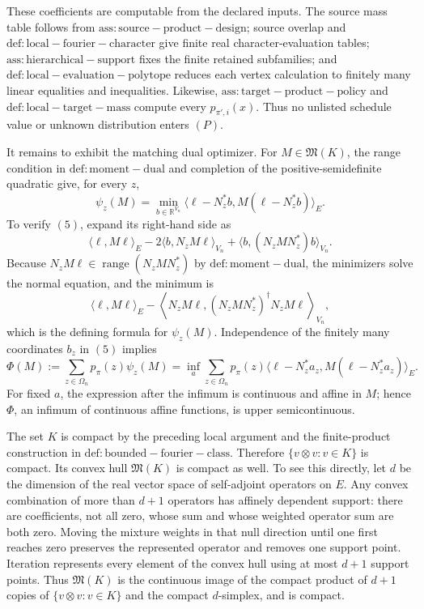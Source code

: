 These coefficients are computable from the declared inputs. The source mass table follows from \(\mathrm{ass:source-product-design}\); source overlap and \(\mathrm{def:local-fourier-character}\) give finite real character-evaluation tables; \(\mathrm{ass:hierarchical-support}\) fixes the finite retained subfamilies; and \(\mathrm{def:local-evaluation-polytope}\) reduces each vertex calculation to finitely many linear equalities and inequalities. Likewise, \(\mathrm{ass:target-product-policy}\) and \(\mathrm{def:local-target-mass}\) compute every \(p_{\pi',i}(x)\). Thus no unlisted schedule value or unknown distribution enters \((P)\).

It remains to exhibit the matching dual optimizer. For \(M\in\mathfrak M(K)\), the range condition in \(\mathrm{def:moment-dual}\) and completion of the positive-semidefinite quadratic give, for every \(z\),
\[
\psi_z(M)=\min_{b\in\mathbb R^{V_n}}
\langle\ell-N_z^{\ast}b,M(\ell-N_z^{\ast}b)\rangle_E.
\tag{5}
\]
To verify \((5)\), expand its right-hand side as
\[
\langle\ell,M\ell\rangle_E
-2\langle b,N_zM\ell\rangle_{V_n}
+\langle b,(N_zMN_z^{\ast})b\rangle_{V_n}.
\]
Because \(N_zM\ell\in\operatorname{range}(N_zMN_z^{\ast})\) by \(\mathrm{def:moment-dual}\), the minimizers solve the normal equation, and the minimum is
\[
\langle\ell,M\ell\rangle_E
-\left\langle N_zM\ell,
(N_zMN_z^{\ast})^{\dagger}N_zM\ell\right\rangle_{V_n},
\]
which is the defining formula for \(\psi_z(M)\). Independence of the finitely many coordinates \(b_z\) in \((5)\) implies
\[
\Phi(M):=\sum_{z\in\Omega_n}p_{\pi}(z)\psi_z(M)
=\inf_a\sum_{z\in\Omega_n}p_{\pi}(z)
\langle\ell-N_z^{\ast}a_z,M(\ell-N_z^{\ast}a_z)\rangle_E.
\tag{6}
\]
For fixed \(a\), the expression after the infimum is continuous and affine in \(M\); hence \(\Phi\), an infimum of continuous affine functions, is upper semicontinuous.

The set \(K\) is compact by the preceding local argument and the finite-product construction in \(\mathrm{def:bounded-fourier-class}\). Therefore \(\{v\otimes v:v\in K\}\) is compact. Its convex hull \(\mathfrak M(K)\) is compact as well. To see this directly, let \(d\) be the dimension of the real vector space of self-adjoint operators on \(E\). Any convex combination of more than \(d+1\) operators has affinely dependent support: there are coefficients, not all zero, whose sum and whose weighted operator sum are both zero. Moving the mixture weights in that null direction until one first reaches zero preserves the represented operator and removes one support point. Iteration represents every element of the convex hull using at most \(d+1\) support points. Thus \(\mathfrak M(K)\) is the continuous image of the compact product of \(d+1\) copies of \(\{v\otimes v:v\in K\}\) and the compact \(d\)-simplex, and is compact.

